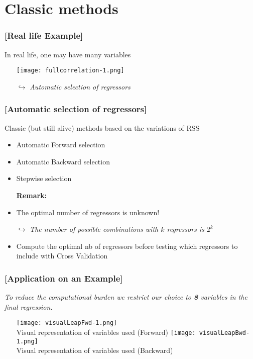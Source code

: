 \documentclass[xcolor=x11names,compress]{beamer}
\renewcommand{\(}{\begin{columns}}
\renewcommand{\)}{\end{columns}}
\newcommand{\<}[1]{\begin{column}{#1}}
\renewcommand{\>}{\end{column}}
\begin{document}
\section{Classic methods}

\begin{frame} %
\frametitle{\textcolor{brique}{[Real life Example]}}
In real life, one may have many variables
\pause
\begin{itemize}[<+->]
  \item[] \texttt{[image: fullcorrelation-1.png]}
  \item[$\hookrightarrow$] \textit{Automatic selection of regressors }
\end{itemize}
\end{frame}

\begin{frame} %
\frametitle{\textcolor{brique}{[Automatic selection of regressors]}}
Classic (but still alive) methods based on the variations of RSS
\pause
\begin{itemize}[<+->]
  \item Automatic Forward selection
  \item Automatic Backward selection
  \item Stepwise selection
  \item[\textbf{Remark:}]
  \item The optimal number of regressors is unknown!
  \item[$\hookrightarrow$] \textit{The number of possible combinations with $k$ regressors is $2^k$ }
  \item Compute the optimal nb of regressors before testing which regressors to include with Cross Validation
\end{itemize}
\end{frame}

\begin{frame} %
\frametitle{\textcolor{brique}{[Application on an Example]}}
\emph{To reduce the computational burden we restrict our choice to \textbf{8} variables in the final regression.}
\pause
\begin{itemize}
  \item[]
   { \texttt{[image: visualLeapFwd-1.png]} \\ }
   {Visual representation of variables used (Forward) }
   {\texttt{[image: visualLeapBwd-1.png]} \\ }
   {Visual representation of variables used (Backward) }
\end{itemize}
\end{frame}
\end{document}
